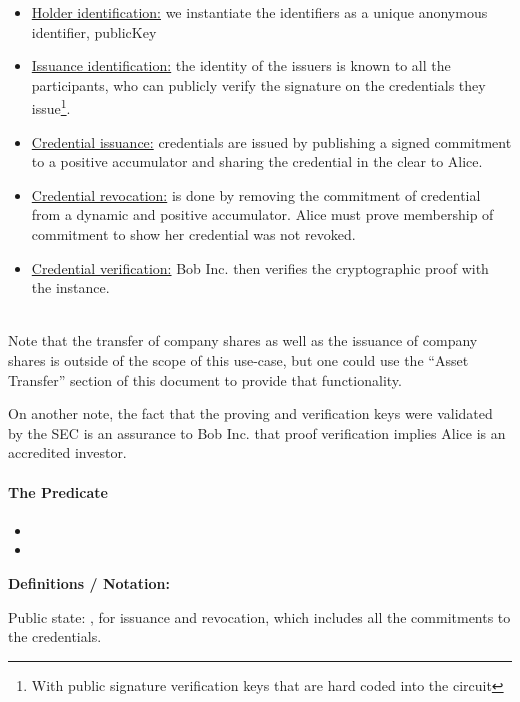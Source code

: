 \begin{itemize}
    \item \underline{Holder identification:} we instantiate the identifiers as a unique anonymous identifier, publicKey
    \item \underline{Issuance identification:} the identity of the issuers is known to all the participants, who can publicly verify the signature on the credentials they issue\footnote{With public signature verification keys that are hard coded into the circuit}.
    \item \underline{Credential issuance:} credentials are issued by publishing a signed commitment to a positive accumulator and sharing the credential in the clear to Alice.
    \item \underline{Credential revocation:} is done by removing the commitment of credential from a dynamic and positive accumulator. 
		Alice must prove membership of commitment to show her credential was not revoked.
    \item \underline{Credential verification:} Bob Inc. then verifies the cryptographic proof with the instance.
\end{itemize}


\mbox{}\\
Note that the transfer of company shares as well as the issuance of company shares is outside of the scope of this use-case, but one could use the “Asset Transfer” section of this document to provide that functionality. 

On another note, the fact that the proving and verification keys were validated by the SEC is an assurance to Bob Inc. that proof verification implies Alice is an accredited investor.


\paragraph{The Predicate}
\begin{itemize}
\item {}
\item {}
\end{itemize}



\textbf{Definitions / Notation:}


Public state: , for issuance and revocation, which includes all the commitments to the credentials.



